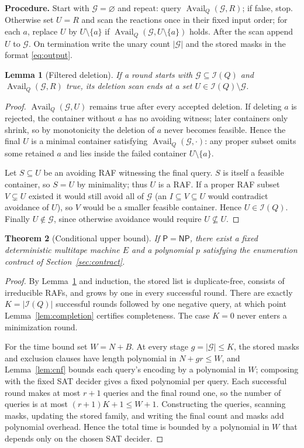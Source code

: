 \documentclass[11pt,a4paper]{article}
\theoremstyle{plain}
\newtheorem{theorem}{Theorem}[section]
\newtheorem{lemma}[theorem]{Lemma}
\theoremstyle{definition}
\theoremstyle{remark}
\newcommand{\Irr}{\mathcal I}
\newcommand{\Avail}{\operatorname{Avail}}
\newcommand{\PP}{\mathsf P}
\newcommand{\NP}{\mathsf{NP}}
\newcommand{\cG}{\mathcal G}
\begin{document}
\medskip
\noindent\textbf{Procedure.} Start with $\cG=\varnothing$ and repeat: query $\Avail_Q(\cG,R)$; if false, stop. Otherwise set $U=R$ and scan the reactions once in their fixed input order; for each $a$, replace $U$ by $U\setminus\{a\}$ if $\Avail_Q(\cG,U\setminus\{a\})$ holds. After the scan append $U$ to $\cG$. On termination write the unary count $|\cG|$ and the stored masks in the format \eqref{eq:output}.

\begin{lemma}[Filtered deletion]\label{lem:sweep}
If a round starts with $\cG\subseteq\Irr(Q)$ and $\Avail_Q(\cG,R)$ true, its deletion scan ends at a set $U\in\Irr(Q)\setminus\cG$.
\end{lemma}
\begin{proof}
$\Avail_Q(\cG,U)$ remains true after every accepted deletion. If deleting $a$ is rejected, the container without $a$ has no avoiding witness; later containers only shrink, so by monotonicity the deletion of $a$ never becomes feasible. Hence the final $U$ is a minimal container satisfying $\Avail_Q(\cG,\cdot)$: any proper subset omits some retained $a$ and lies inside the failed container $U\setminus\{a\}$.

Let $S\subseteq U$ be an avoiding RAF witnessing the final query. $S$ is itself a feasible container, so $S=U$ by minimality; thus $U$ is a RAF. If a proper RAF subset $V\subsetneq U$ existed it would still avoid all of $\cG$ (an $I\subseteq V\subseteq U$ would contradict avoidance of $U$), so $V$ would be a smaller feasible container. Hence $U\in\Irr(Q)$. Finally $U\notin\cG$, since otherwise avoidance would require $U\nsubseteq U$.
\end{proof}

\begin{theorem}[Conditional upper bound]\label{thm:upper}
If $\PP=\NP$, there exist a fixed deterministic multitape machine $E$ and a polynomial $p$ satisfying the enumeration contract of Section~\ref{sec:contract}.
\end{theorem}
\begin{proof}
By Lemma~\ref{lem:sweep} and induction, the stored list is duplicate-free, consists of irreducible RAFs, and grows by one in every successful round. There are exactly $K=|\Irr(Q)|$ successful rounds followed by one negative query, at which point Lemma~\ref{lem:completion} certifies completeness. The case $K=0$ never enters a minimization round.

For the time bound set $W=N+B$. At every stage $g=|\cG|\le K$, the stored masks and exclusion clauses have length polynomial in $N+gr\le W$, and Lemma~\ref{lem:cnf} bounds each query's encoding by a polynomial in $W$; composing with the fixed SAT decider gives a fixed polynomial per query. Each successful round makes at most $r+1$ queries and the final round one, so the number of queries is at most $(r+1)K+1\le W+1$. Constructing the queries, scanning masks, updating the stored family, and writing the final count and masks add polynomial overhead. Hence the total time is bounded by a polynomial in $W$ that depends only on the chosen SAT decider.
\end{proof}
\end{document}
